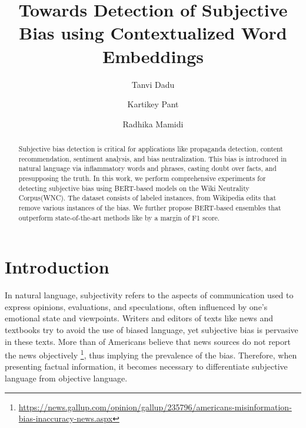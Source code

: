 \documentclass[sigconf,nonacm]{acmart}
\begin{document}
\sloppy
\title{Towards Detection of Subjective Bias using Contextualized Word Embeddings}



\author{Tanvi Dadu}
\authornotemark[1]

\author{Kartikey Pant}

\author{Radhika Mamidi}












\renewcommand{\shortauthors}{Dadu, Pant, and Mamidi}
\begin{abstract}
Subjective bias detection is critical for applications like propaganda detection, content recommendation, sentiment analysis, and bias neutralization. This bias is introduced in natural language via inflammatory words and phrases, casting doubt over facts, and presupposing the truth. In this work, we perform comprehensive experiments for detecting subjective bias using BERT-based models on the Wiki Neutrality Corpus(WNC). The dataset consists of  labeled instances, from Wikipedia edits that remove various instances of the bias. We further propose BERT-based ensembles that outperform state-of-the-art methods like  by a margin of  F1 score. 
\end{abstract}







\maketitle

\section{Introduction}
In natural language, subjectivity refers to the aspects of communication used to express opinions, evaluations, and speculations\cite{Wiebe1994}, often influenced by one's emotional state and viewpoints. Writers and editors of texts like news and textbooks try to avoid the use of biased language, yet subjective bias is pervasive in these texts. More than  of Americans believe that news sources do not report the news objectively \footnote{\url{https://news.gallup.com/opinion/gallup/235796/americans-misinformation-bias-inaccuracy-news.aspx}}, thus implying the prevalence of the bias. Therefore, when presenting factual information, it becomes necessary to differentiate subjective language from objective language.
\end{document}
